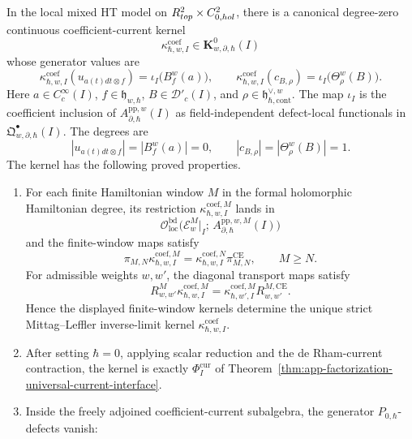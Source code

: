 \begin{prop}
\label{prop:app-bulk-defect-kernel-layer}
  In the local mixed HT model on
  \(R^2_{top}\times C^2_{0,hol}\), there is
  a canonical degree-zero continuous coefficient-current kernel
  \[
    \kappa^{\mathrm{coef}}_{\hbar,w,I}
      \in \mathbf K^0_{w,\partial,\hbar}(I)
  \]
  whose generator values are
  \[
    \kappa^{\mathrm{coef}}_{\hbar,w,I}
      (u_{a(t)dt\otimes f})
      =\iota_I\bigl(B^w_f(a)\bigr),
    \qquad
    \kappa^{\mathrm{coef}}_{\hbar,w,I}(c_{B,\rho})
      =\iota_I\bigl(\Theta^w_\rho(B)\bigr).
  \]
  Here
  \(a\in C^\infty_c(I)\), \(f\in\mathfrak h_{w,\hbar}\),
  \(B\in\mathcal D'_c(I)\), and
  \(\rho\in\mathfrak h^{\vee,w}_{\hbar,\mathrm{cont}}\).  The map
  \(\iota_I\) is the coefficient inclusion of
  \(A^{\mathrm{pp},w}_{\partial,\hbar}(I)\) as field-independent
  defect-local functionals in
  \(\mathfrak Q^\bullet_{w,\partial,\hbar}(I)\).  The degrees are
  \[
    |u_{a(t)dt\otimes f}|=|B^w_f(a)|=0,\qquad
    |c_{B,\rho}|=|\Theta^w_\rho(B)|=1.
  \]
  The kernel has the following proved properties.
  \begin{enumerate}
    \item For each finite Hamiltonian window \(M\) in the formal
    holomorphic Hamiltonian degree, its restriction
    \(\kappa^{\mathrm{coef},M}_{\hbar,w,I}\) lands in
    \[
      \mathcal O_{\mathrm{loc}}^{\mathrm{bd}}\bigl(
        \mathcal E_w^M|_I;\,
        A_{\partial,\hbar}^{\mathrm{pp},w,M}(I)\bigr)
    \]
    and the finite-window maps satisfy
    \[
      \pi_{M,N}\kappa^{\mathrm{coef},M}_{\hbar,w,I}
        =
      \kappa^{\mathrm{coef},N}_{\hbar,w,I}\pi_{M,N}^{\mathrm{CE}},
      \qquad M\geq N.
    \]
    For admissible weights \(w,w'\), the diagonal transport maps satisfy
    \[
      R^M_{w,w'}\kappa^{\mathrm{coef},M}_{\hbar,w,I}
        =
      \kappa^{\mathrm{coef},M}_{\hbar,w',I}R^{M,\mathrm{CE}}_{w,w'}.
    \]
    Hence the displayed finite-window kernels determine the unique
    strict Mittag--Leffler inverse-limit kernel
    \(\kappa^{\mathrm{coef}}_{\hbar,w,I}\).
    \item After setting \(\hbar=0\), applying scalar reduction and the
    de Rham-current contraction, the kernel is exactly
    \(\Phi_I^{\mathrm{cur}}\) of
    Theorem~\ref{thm:app-factorization-universal-current-interface}.
    \item Inside the freely adjoined coefficient-current subalgebra, the
    generator \(P_{0,\hbar}\)-defects vanish:
    \[
\]
\end{enumerate}
\end{prop}
